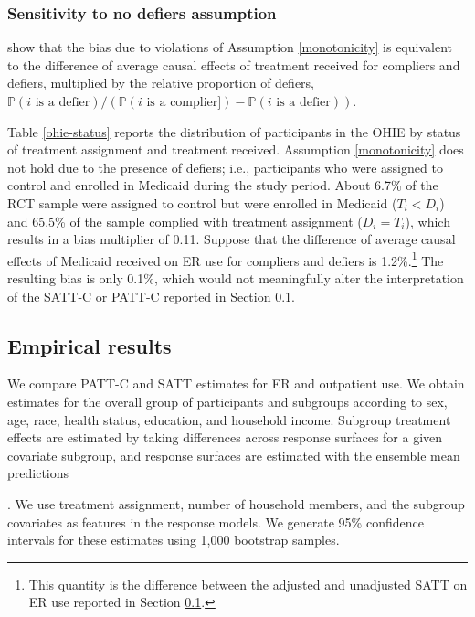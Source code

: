 \documentclass[hidelinks,12pt]{article}
\newcommand{\pr}{\mathbb{P}} %
\begin{document}
{{\color{red}
\subsubsection{Sensitivity to no defiers assumption} \label{sens-defiers}
}

\citet{Angrist1996} show that the bias due to violations of Assumption \ref{monotonicity} is equivalent to the difference of average causal effects of treatment received for compliers and defiers, multiplied by the relative proportion of defiers, 
$\pr(i\text{ is a defier}) / (\pr(i\text{ is a complier]}) - \pr(i\text{ is a defier})).$

Table \ref{ohie-status} reports the distribution of participants in the OHIE by status of treatment assignment and treatment received. Assumption \ref{monotonicity} does not hold due to the presence of defiers; i.e., participants who were assigned to control and enrolled in Medicaid during the study period. About 6.7\% of the RCT sample were assigned to control but were enrolled in Medicaid ($T_i < D_i$) and 65.5\% of the sample complied with treatment assignment ($D_i = T_i$), which results in a bias multiplier of 0.11. Suppose that the difference of average causal effects of Medicaid received on ER use for compliers and defiers is 1.2\%.\footnote{This quantity is the difference between the adjusted and unadjusted SATT on ER use reported in Section \ref{results}.} The resulting bias is only 0.1\%, which would not meaningfully alter the interpretation of the SATT-C or PATT-C reported in Section \ref{results}. 
 
\subsection{Empirical results}\label{results}

We compare PATT-C and SATT estimates for ER and outpatient use. We obtain estimates for the overall group of participants and subgroups according to sex, age, race, health status, education, and household income. Subgroup treatment effects are estimated by taking differences across response surfaces for a given covariate subgroup, and response surfaces are estimated with {\color{red}the ensemble mean predictions}}. We use treatment assignment, number of household members, and the subgroup covariates as features in the response models. We generate 95\% confidence intervals for these estimates using 1,000 bootstrap samples.%
\end{document}
